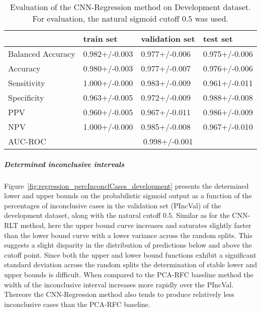 \begin{table}[ht]
  \caption{Evaluation of the CNN-Regression method on Development dataset. 
  For evaluation, the natural sigmoid cutoff $0.5$ was used.}
  \centering
  \begin{tabular}{llll}
      \hline
                        & train set         & validation set      & test set             \\
      \hline
      Balanced Accuracy & 0.982+/-0.003   &  0.977+/-0.006    &  0.975+/-0.006 \\
      Accuracy          & 0.980+/-0.003     &   0.977+/-0.007   &  0.976+/-0.006  \\
      Sensitivity       &  1.000+/-0.000   &   0.983+/-0.009   &  0.961+/-0.011 \\
      Specificity       &   0.963+/-0.005  &   0.972+/-0.009 &   0.988+/-0.008 \\
      PPV               &  0.960+/-0.005    &   0.967+/-0.011  &  0.986+/-0.009  \\
      NPV               &  1.000+/-0.000  &   0.985+/-0.008   & 0.967+/-0.010 \\
      \hline
      AUC-ROC          &  \multicolumn{3}{c}{0.998+/-0.001}  \\
      \hline
  \end{tabular}
 \label{t1:cnn_regression_perf_eval_table}
\end{table}


\subparagraph{Determined inconclusive intervals}

Figure~\ref{fig:regression_percInconclCases_development} presents the determined lower and upper bounds on the 
probabilistic sigmoid output as a function of the percentages of inconclusive cases 
in the validation set (PIncVal) of the development dataset, along with the natural cutoff $0.5$.
Similar as for the CNN-RLT method, 
here the upper bound curve increases and saturates slightly faster than the lower bound curve with a lower variance across 
the random splits.
This suggests a slight disparity in the distribution of predictions below and above the cutoff point.
Since both the upper and lower bound functions exhibit a significant standard deviation across the random splits 
the determination of stable lower and upper bounds is difficult.
When compared to the PCA-RFC baseline method 
the width of the inconclusive interval increases more rapidly over the PIncVal.
Thereore the CNN-Regression method also tends to produce relatively less inconclusive cases than the PCA-RFC baseline.


